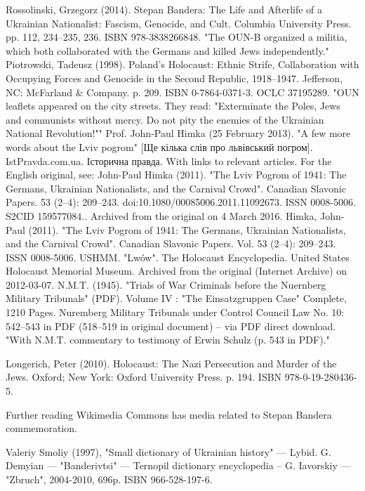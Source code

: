 Rossolinski, Grzegorz (2014). Stepan Bandera: The Life and Afterlife of a Ukrainian Nationalist: Fascism, Genocide, and Cult. Columbia University Press. pp. 112, 234–235, 236. ISBN 978-3838266848. "The OUN-B organized a militia, which both collaborated with the Germans and killed Jews independently."
Piotrowski, Tadeusz (1998). Poland's Holocaust: Ethnic Strife, Collaboration with Occupying Forces and Genocide in the Second Republic, 1918–1947. Jefferson, NC: McFarland & Company. p. 209. ISBN 0-7864-0371-3. OCLC 37195289. "OUN leaflets appeared on the city streets. They read: "Exterminate the Poles, Jews and communists without mercy. Do not pity the enemies of the Ukrainian National Revolution!""
Prof. John-Paul Himka (25 February 2013). "A few more words about the Lviv pogrom" [Ще кілька слів про львівський погром]. IstPravda.com.ua. Історична правда. With links to relevant articles. For the English original, see: John-Paul Himka (2011). "The Lviv Pogrom of 1941: The Germans, Ukrainian Nationalists, and the Carnival Crowd". Canadian Slavonic Papers. 53 (2–4): 209–243. doi:10.1080/00085006.2011.11092673. ISSN 0008-5006. S2CID 159577084.. Archived from the original on 4 March 2016.
Himka, John-Paul (2011). "The Lviv Pogrom of 1941: The Germans, Ukrainian Nationalists, and the Carnival Crowd". Canadian Slavonic Papers. Vol. 53 (2–4): 209–243. ISSN 0008-5006.
USHMM. "Lwów". The Holocaust Encyclopedia. United States Holocaust Memorial Museum. Archived from the original (Internet Archive) on 2012-03-07.
N.M.T. (1945). "Trials of War Criminals before the Nuernberg Military Tribunals" (PDF). Volume IV : "The Einsatzgruppen Case" Complete, 1210 Pages. Nuremberg Military Tribunals under Control Council Law No. 10: 542–543 in PDF (518–519 in original document) – via PDF direct download. "With N.M.T. commentary to testimony of Erwin Schulz (p. 543 in PDF)."

    Longerich, Peter (2010). Holocaust: The Nazi Persecution and Murder of the Jews. Oxford; New York: Oxford University Press. p. 194. ISBN 978-0-19-280436-5.

Further reading
	Wikimedia Commons has media related to Stepan Bandera commemoration.

    Valeriy Smoliy (1997), "Small dictionary of Ukrainian history" — Lybid.
    G. Demyian — "Banderivtsi" — Ternopil dictionary encyclopedia – G. Iavorskiy — "Zbruch", 2004-2010, 696p. ISBN 966-528-197-6.
